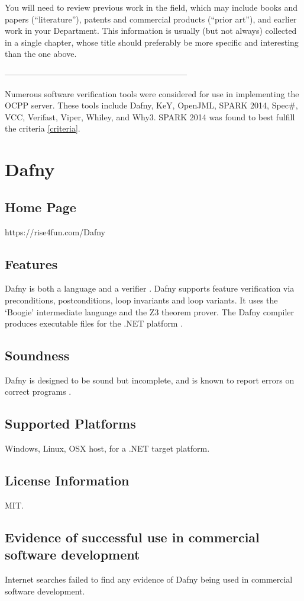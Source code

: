 \documentclass[12pt,openany,a4paper]{book}
\begin{document}
You will need to review previous work in the field, which may include books and
papers (“literature”), patents and commercial products (“prior art”), and earlier
work in your Department. This information is usually (but not always) collected in
a single chapter, whose title should preferably be more specific and interesting than
the one above.

------------------------------------------------------------------

Numerous software verification tools were considered for use in implementing the OCPP server. These tools include Dafny, KeY, OpenJML, SPARK 2014, Spec\#, VCC, Verifast, Viper, Whiley, and Why3. SPARK 2014 was found to best fulfill the criteria \ref{criteria}.

\section{Dafny}
	\subsection{Home Page}%
		https://rise4fun.com/Dafny
	\subsection{Features}
		Dafny is both a language and a verifier \cite{LeinoK.R.M.2010DAap}. Dafny supports feature verification via preconditions, postconditions, loop invariants and loop variants. It uses the `Boogie' intermediate language and the Z3 theorem prover. The Dafny compiler produces executable files for the .NET platform \cite{dafny02}.
	\subsection{Soundness}
		Dafny is designed to be sound but incomplete, and is known to report errors on correct programs \cite{dafny01}.
	\subsection{Supported Platforms}
		Windows, Linux, OSX host, for a .NET target platform.
	\subsection{License Information}
		MIT.
	\subsection{Evidence of successful use in commercial software development}
		Internet searches failed to find any evidence of Dafny being used in commercial software development. 		
\end{document}
